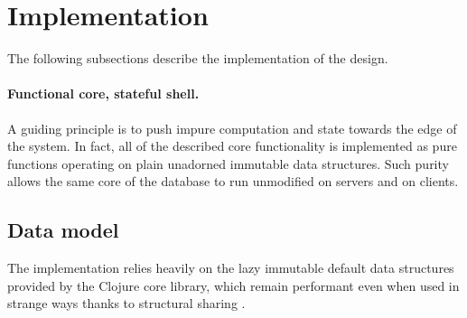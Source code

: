 \section{Implementation}\label{sec:implementation}

The following subsections describe the implementation of the design.

\paragraph{Functional core, stateful shell.}
A guiding principle is to push impure computation and state towards the edge of the system. In fact, all of the described core functionality is implemented as pure functions operating on plain unadorned immutable data structures. Such purity allows the same core of the database to run unmodified on servers and on clients.


\subsection{Data model}
The implementation relies heavily on the lazy immutable default data structures \cite{hickey2009persistent} provided by the Clojure core library, which remain performant even when used in strange ways thanks to structural sharing \cite{okasaki1999purely}.



